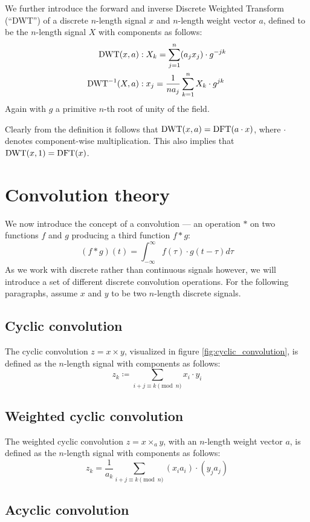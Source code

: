 We further introduce the forward and inverse Discrete Weighted Transform
(``DWT'') of a discrete $n$-length signal $x$ and $n$-length weight vector $a$,
defined to be the $n$-length signal $X$ with components as follows:
\begin{align*}
		\operatorname{DWT}(x, a) & : X_k = \sum_{j=1}^{n} (a_j x_j) \cdot g^{-jk} \\
		\operatorname{DWT}^{-1}(X, a) & : x_j = \frac{1}{n a_j} \sum_{k=1}^{n} X_k \cdot g^{jk}
\end{align*}
Again with $g$ a primitive $n$-th root of unity of the field.

Clearly from the definition it follows that $\operatorname{DWT}(x, a) = \operatorname{DFT}(a \cdot x)$,
where $\cdot$ denotes component-wise multiplication.
This also implies that $\operatorname{DWT}(x, 1) = \operatorname{DFT}(x)$.

\section{Convolution theory}

We now introduce the concept of a convolution --- an operation $*$ on two
functions $f$ and $g$ producing a third function $f * g$:
\[
		(f * g)(t) = \int_{-\infty}^{\infty} f(\tau) \cdot g(t - \tau) d\tau
\]
As we work with discrete rather than continuous signals however, we will
introduce a set of different discrete convolution operations. For the following
paragraphs, assume $x$ and $y$ to be two $n$-length discrete signals.

\subsection{Cyclic convolution}

The cyclic convolution $z = x \times y$, visualized in figure
\ref{fig:cyclic_convolution}, is defined as the $n$-length signal with
components as follows:
\[
		z_k \coloneqq \sum_{i + j \equiv k \pmod{n}} x_i \cdot y_i
\]

\subsection{Weighted cyclic convolution}

The weighted cyclic convolution $z = x \times_a y$, with an $n$-length weight
vector $a$, is defined as the $n$-length signal with components as follows:
\[
		z_k = \frac{1}{a_k} \sum_{i + j \equiv k \pmod{n}} (x_i a_i) \cdot (y_j a_j)
\]

\subsection{Acyclic convolution}


